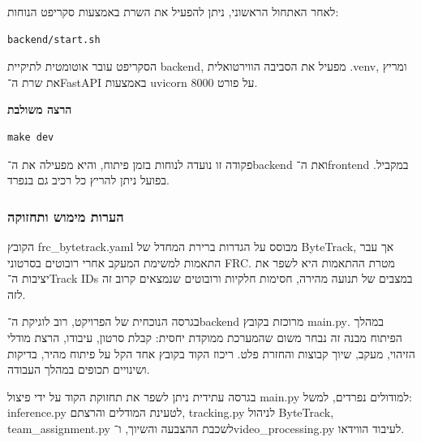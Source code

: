 לאחר האתחול הראשוני, ניתן להפעיל את השרת באמצעות סקריפט הנוחות:

\begin{english}
\begin{verbatim}
backend/start.sh
\end{verbatim}
\end{english}

הסקריפט עובר אוטומטית לתיקיית \textenglish{backend}, מפעיל את הסביבה
הווירטואלית \textenglish{.venv}, ומריץ את שרת ה־\textenglish{FastAPI}
באמצעות \textenglish{uvicorn} על פורט \textenglish{8000}.

\noindent\textbf{הרצה משולבת}

\begin{english}
\begin{verbatim}
make dev
\end{verbatim}
\end{english}

פקודה זו נועדה לנוחות בזמן פיתוח, והיא מפעילה את ה־\textenglish{backend}
ואת ה־\textenglish{frontend} במקביל. בפועל ניתן להריץ כל רכיב גם בנפרד.

\subsubsection{הערות מימוש ותחזוקה}

הקובץ \textenglish{frc\_bytetrack.yaml} מבוסס על הגדרות ברירת המחדל של
\textenglish{ByteTrack}, אך עבר התאמות למשימת המעקב אחרי רובוטים
בסרטוני \textenglish{FRC}. מטרת ההתאמות היא לשפר את יציבות
ה־\textenglish{Track IDs} במצבים של תנועה מהירה, חסימות חלקיות
ורובוטים שנמצאים קרוב זה לזה.

בגרסה הנוכחית של הפרויקט, רוב לוגיקת ה־\textenglish{backend} מרוכזת
בקובץ \textenglish{main.py}. במהלך הפיתוח מבנה זה נבחר משום שהמערכת
ממוקדת יחסית: קבלת סרטון, עיבודו, הרצת מודלי הזיהוי, מעקב, שיוך קבוצות
והחזרת פלט. ריכוז הקוד בקובץ אחד הקל על פיתוח מהיר, בדיקות ושינויים
תכופים במהלך העבודה.

בגרסה עתידית ניתן לשפר את תחזוקת הקוד על ידי פיצול
\textenglish{main.py} למודולים נפרדים, למשל:
\textenglish{inference.py} לטעינת המודלים והרצתם,
\textenglish{tracking.py} לניהול \textenglish{ByteTrack},
\textenglish{team\_assignment.py} לשכבת ההצבעה והשיוך,
ו־\textenglish{video\_processing.py} לעיבוד הווידאו.
